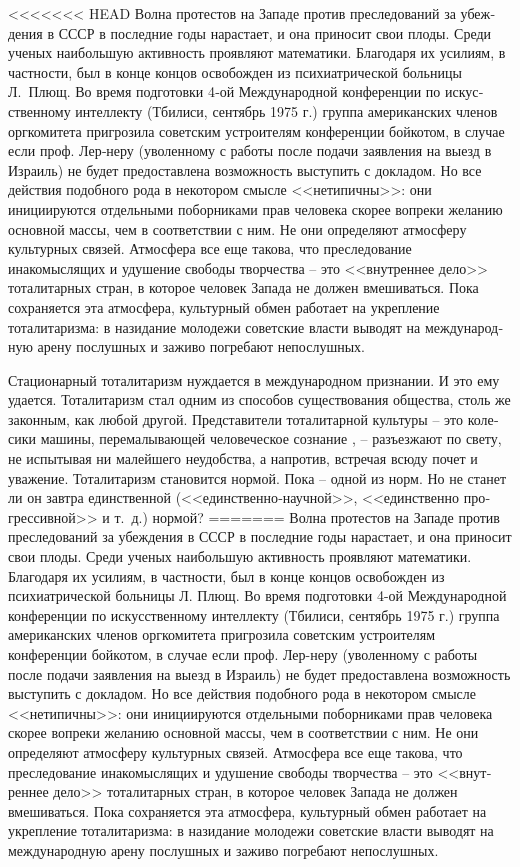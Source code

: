 \documentclass{book}
\begin{document}
{<<<<<<< HEAD
Волна протестов на Западе против преследований за убеж­дения в СССР в последние годы нарастает, и она приносит свои плоды. Среди ученых наибольшую активность проявляют мате­матики. Благодаря их усилиям, в частности, был в конце кон­цов освобожден из психиатрической больницы Л.~Плющ. Во время подготовки 4‑ой Международной конференции по искус­ственному интеллекту (Тбилиси, сентябрь 1975 г.) группа американских членов оргкомитета пригрозила советским уст­роителям конференции бойкотом, в случае если проф. Лер‑неру (уволенному с работы после подачи заявления на выезд в Израиль) не будет предоставлена возможность выступить с докладом. Но все действия подобного рода в некотором смыс­ле <<нетипичны>>: они инициируются отдельными поборниками прав человека скорее вопреки желанию основной массы, чем в соответствии с ним. Не они определяют атмосферу культур­ных связей. Атмосфера все еще такова, что преследование инакомыслящих и удушение свободы творчества -- это <<внут­реннее дело>> тоталитарных стран, в которое человек Запада не должен вмешиваться. Пока сохраняется эта атмосфера, культурный обмен работает на укрепление тоталитаризма: в назидание молодежи советские власти выводят на международ­ную арену послушных и заживо погребают непослушных.

Стационарный тоталитаризм нуждается в международном признании. И это ему удается. Тоталитаризм стал одним из спо­собов существования общества, столь же законным, как лю­бой другой. Представители тоталитарной культуры -- это коле­сики машины, перемалывающей человеческое сознание , -- разъез­жают по свету, не испытывая ни малейшего неудобства, а на­против, встречая всюду почет и уважение. Тоталитаризм стано­вится нормой. Пока -- одной из норм. Но не станет ли он завт­ра единственной  (<<единственно‑научной>>, <<единственно про­грессивной>> и т.~д.) нормой?
=======
Волна протестов на Западе против преследований за убеж­дения в СССР в последние годы нарастает, и она приносит свои плоды. Среди ученых наибольшую активность проявляют мате­матики. Благодаря их усилиям, в частности, был в конце кон­цов освобожден из психиатрической больницы Л. Плющ. Во время подготовки 4-ой Международной конференции по искус­ственному интеллекту (Тбилиси, сентябрь 1975 г.) группа американских членов оргкомитета пригрозила советским уст­роителям конференции бойкотом, в случае если проф. Лер-неру (уволенному с работы после подачи заявления на выезд в Израиль) не будет предоставлена возможность выступить с докладом. Но все действия подобного рода в некотором смыс­ле <<нетипичны>>: они инициируются отдельными поборниками прав человека скорее вопреки желанию основной массы, чем в соответствии с ним. Не они определяют атмосферу культур­ных связей. Атмосфера все еще такова, что преследование инакомыслящих и удушение свободы творчества -- это <<внут­реннее дело>> тоталитарных стран, в которое человек 
Запада не должен вмешиваться. Пока сохраняется эта атмосфера, культурный обмен работает на укрепление тоталитаризма: в назидание молодежи советские власти выводят на международ­ную арену послушных и заживо погребают непослушных.

}
\end{document}
